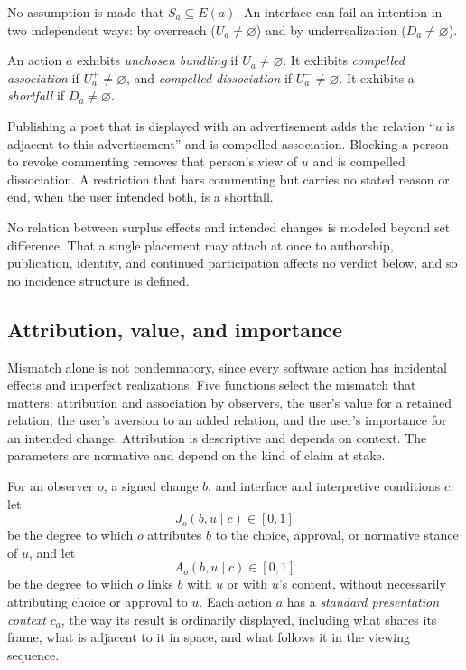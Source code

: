 No assumption is made that $S_a\subseteq E(a)$. An interface can fail an intention in two independent ways: by overreach ($U_a\ne\varnothing$) and by underrealization ($D_a\neq\varnothing$).

\begin{definition}
An action $a$ exhibits \emph{unchosen bundling} if $U_a\neq\varnothing$. It exhibits \emph{compelled association} if $U_a^{+}\neq\varnothing$, and \emph{compelled dissociation} if $U_a^{-}\neq\varnothing$. It exhibits a \emph{shortfall} if $D_a\neq\varnothing$.
\end{definition}

Publishing a post that is displayed with an advertisement adds the relation ``$u$ is adjacent to this advertisement'' and is compelled association. Blocking a person to revoke commenting removes that person's view of $u$ and is compelled dissociation. A restriction that bars commenting but carries no stated reason or end, when the user intended both, is a shortfall.

\begin{remark}
No relation between surplus effects and intended changes is modeled beyond set difference. That a single placement may attach at once to authorship, publication, identity, and continued participation affects no verdict below, and so no incidence structure is defined.
\end{remark}

\subsection{Attribution, value, and importance}

Mismatch alone is not condemnatory, since every software action has incidental effects and imperfect realizations. Five functions select the mismatch that matters: attribution and association by observers, the user's value for a retained relation, the user's aversion to an added relation, and the user's importance for an intended change. Attribution is descriptive and depends on context. The parameters are normative and depend on the kind of claim at stake.

\begin{definition}
For an observer $o$, a signed change $b$, and interface and interpretive conditions $c$, let
\[
J_o(b,u\mid c)\in[0,1]
\]
be the degree to which $o$ attributes $b$ to the choice, approval, or normative stance of $u$, and let
\[
A_o(b,u\mid c)\in[0,1]
\]
be the degree to which $o$ links $b$ with $u$ or with $u$'s content, without necessarily attributing choice or approval to $u$. Each action $a$ has a \emph{standard presentation context} $c_a$, the way its result is ordinarily displayed, including what shares its frame, what is adjacent to it in space, and what follows it in the viewing sequence.
\end{definition}

